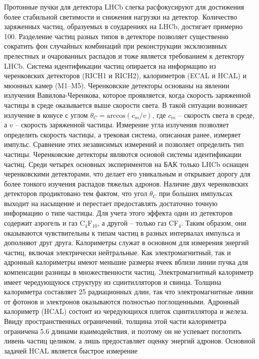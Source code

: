 Протонные пучки для детектора LHCb слегка расфокусируют для достижения 
более стабильной светимости и снижения нагрузки на детектор. Количество 
заряженных частиц, образуемых в соударениях на LHCb, достигает примерно 
100. Разделение частиц разных типов в детекторе позволяет существенно 
сократить фон случайных комбинаций при реконструкции эксклюзивных 
прелестных и очарованных распадов и тоже является требованием 
к детектору LHCb.
%
Система идентификации частиц опирается на информацию из черенковских 
детекторов (RICH1 и RICH2), калориметров (ECAL и HCAL) и мюонных камер 
(M1--M5). Черенковские детекторы основаны на явлении излучения 
Вавилова-Черенкова, которое проявляется, когда скорость заряженной 
частицы в среде оказывается выше скорости света. В такой ситуации 
возникает излучение в конусе с углом $\theta_C = \mathrm{arccos}(c_m/v)$,
где $c_m$ -- скорость света в среде, а $v$ -- скорость заряженной 
частицы. Измерение угла излучения позволяет определить скорость частицы, 
а трековая система, описанная ранее, измеряет импульс. Сравнение этих 
независимых измерений и позволяет определить тип частицы. Черенковские 
детекторы являются основой системы идентификации частиц. Среди четырех 
основных экспериментов на БАК только LHCb оснащен черенковскими 
детекторами, что делает его уникальным и открывает дорогу для более 
тонкого изучения распадов тяжелых адронов. Наличие двух черенковских 
детекторов продиктовано тем фактом, что угол $\theta_C$ при больших 
импульсах выходит на насыщение и перестает предоставлять достаточно 
точную информацию о типе частицы. Для учета этого эффекта один из 
детекторов содержит аэрогель и газ C$_4$F$_{10}$, а другой -- только газ 
CF$_4$. Таким образом, они оказываются чувствительны к типам частиц 
в разных интервалах импульса и дополняют друг друга.
%
Калориметры служат в основном для измерения энергий частиц, включая 
электрически нейтральные. Как электромагнитный, так и адронный 
калориметры имеют меньшие размеры ячеек вблизи линии пучка для 
компенсации разницы в множественности частиц. Электромагнитный 
калориметр имеет чередующуюся структуру из сцинтилляторов и свинца. 
Толщина калориметра составляет 25 радиационных длин, так что 
электромагнитные ливни от фотонов и электронов оказываются полностью 
поглощенными. Адронный калориметр (HCAL) состоит из чередующихся плиток 
сцинтиллятора и железа. Ввиду пространственных ограничений, толщина этой 
части калориметра ограничена 5.6 длинами взаимодействия, и поэтому он не 
успевает поглотить ливень частиц целиком, а лишь предоставляет оценку 
энергий адронов. Основной задачей HCAL является быстрое измерение 
